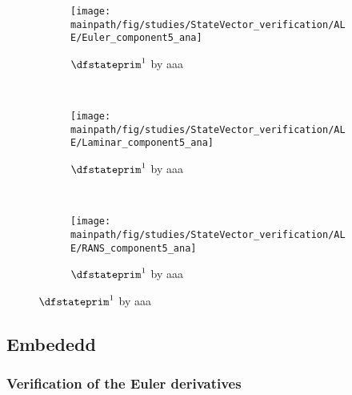 \documentclass[../main.tex]{subfiles}
\begin{document}
\begin{figure}[t!]
    \begin{subfigure}[t]{0.33\textwidth}
        \centering
        \texttt{[image: \\mainpath/fig/studies/StateVector\_verification/ALE/Euler\_component5\_ana]}
        \caption{$\dfstateprim^1$ by aaa}
    \end{subfigure}%
    ~ 
    \begin{subfigure}[t]{0.33\textwidth}
        \centering
        \texttt{[image: \\mainpath/fig/studies/StateVector\_verification/ALE/Laminar\_component5\_ana]}
        \caption{$\dfstateprim^1$ by aaa}
    \end{subfigure}%
    ~ 
    \begin{subfigure}[t]{0.33\textwidth}
        \centering
        \texttt{[image: \\mainpath/fig/studies/StateVector\_verification/ALE/RANS\_component5\_ana]}
        \caption{$\dfstateprim^1$ by aaa}
    \end{subfigure}
\end{figure}

\subsection{Embededd}


\subsubsection{Verification of the Euler derivatives}
\end{document}
